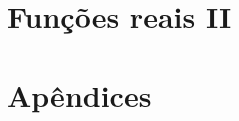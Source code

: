 \documentclass[
	12pt, %
	a4paper, %
	oneside, %
]{LegrandOrangeBook}
\begin{document}
\part{Funções reais II}






\stopcontents[part] %


\part*{}





\chapterspaceabove{6.75cm} %
\chapterspacebelow{7.25cm} %

\appendix
\renewcommand{\chaptername}{Apêndices} %

\part{Apêndices}

%







%



%


\end{document}
